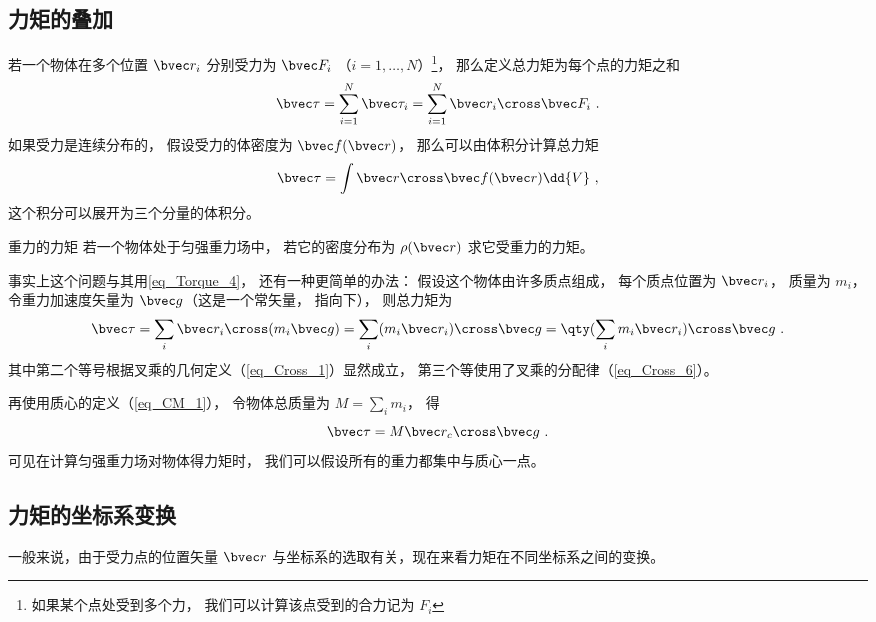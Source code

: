 \subsection{力矩的叠加}

若一个物体在多个位置 $\bvec r_i$ 分别受力为 $\bvec F_i$ （$i = 1, \dots, N$）\footnote{如果某个点处受到多个力， 我们可以计算该点受到的合力记为 $F_i$}， 那么定义总力矩为每个点的力矩之和
\begin{equation}
\bvec \tau = \sum_{i=1}^N \bvec \tau_i = \sum_{i=1}^N \bvec r_i \cross \bvec F_i~.
\end{equation}
如果受力是连续分布的， 假设受力的体密度为 $\bvec f(\bvec r)$， 那么可以由体积分计算总力矩
\begin{equation}\label{eq_Torque_4}
\bvec \tau = \int \bvec r \cross \bvec f(\bvec r) \dd{V}~,
\end{equation}
这个积分可以展开为三个分量的体积分。

\begin{example}{重力的力矩}\label{ex_Torque_1}
若一个物体处于匀强重力场中， 若它的密度分布为 $\rho(\bvec r)$ 求它受重力的力矩。

事实上这个问题与其用\autoref{eq_Torque_4}， 还有一种更简单的办法： 假设这个物体由许多质点组成， 每个质点位置为 $\bvec r_i$， 质量为 $m_i$， 令重力加速度矢量为 $\bvec g$（这是一个常矢量， 指向下）， 则总力矩为
\begin{equation}
\bvec \tau = \sum_i \bvec r_i \cross (m_i \bvec g) = \sum_i (m_i \bvec r_i) \cross \bvec g = \qty(\sum_i m_i \bvec r_i) \cross \bvec g~.
\end{equation}
其中第二个等号根据叉乘的几何定义（\autoref{eq_Cross_1}）显然成立， 第三个等使用了叉乘的分配律（\autoref{eq_Cross_6}）。


再使用质心的定义（\autoref{eq_CM_1}）， 令物体总质量为 $M = \sum_i m_i$， 得
\begin{equation}
\bvec \tau = M \bvec r_c \cross \bvec g~.
\end{equation}
可见在计算匀强重力场对物体得力矩时， 我们可以假设所有的重力都集中与质心一点。
\end{example}

\subsection{力矩的坐标系变换}\label{sub_Torque_1}
一般来说，由于受力点的位置矢量 $\bvec r$ 与坐标系的选取有关，现在来看力矩在不同坐标系之间的变换。

